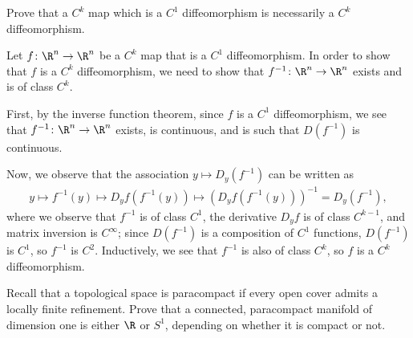 \documentclass[10pt]{mypackage}
\begin{document}
\begin{problem}[Problem 3]
  Prove that a $C^{k}$ map which is a $C^{1}$ diffeomorphism is necessarily a $C^{k}$ diffeomorphism.
\end{problem}
\begin{solution}
  Let $f\colon \R^{n}\rightarrow \R^{n}$ be a $C^{k}$ map that is a $C^{1}$ diffeomorphism. In order to show that $f$ is a $C^{k}$ diffeomorphism, we need to show that $f^{-1}\colon \R^{n}\rightarrow \R^{n}$ exists and is of class $C^{k}$.\newline

  First, by the inverse function theorem, since $f$ is a $C^{1}$ diffeomorphism, we see that $f^{-1}\colon \R^{n}\rightarrow \R^{n}$ exists, is continuous, and is such that $D\left( f^{-1} \right)$ is continuous.\newline

  Now, we observe that the association $y\mapsto D_y\left( f^{-1} \right)$ can be written as
  \begin{align*}
    y \mapsto f^{-1}(y) \mapsto D_{y}f\left( f^{-1}(y) \right) \mapsto \left( D_yf\left( f^{-1}\left( y \right) \right) \right)^{-1} = D_y\left( f^{-1} \right),
  \end{align*}
  where we observe that $f^{-1}$ is of class $C^1$, the derivative $D_y f$ is of class $C^{k-1}$, and matrix inversion is $C^{\infty}$; since $D\left( f^{-1} \right)$ is a composition of $C^{1}$ functions, $D\left( f^{-1} \right)$ is $C^{1}$, so $f^{-1}$ is $C^{2}$. Inductively, we see that $f^{-1}$ is also of class $C^{k}$, so $f$ is a $C^{k}$ diffeomorphism.
\end{solution}
\begin{problem}[Problem 4]
  Recall that a topological space is paracompact if every open cover admits a locally finite refinement. Prove that a connected, paracompact manifold of dimension one is either $\R$ or $S^{1}$, depending on whether it is compact or not.
\end{problem}
\end{document}
